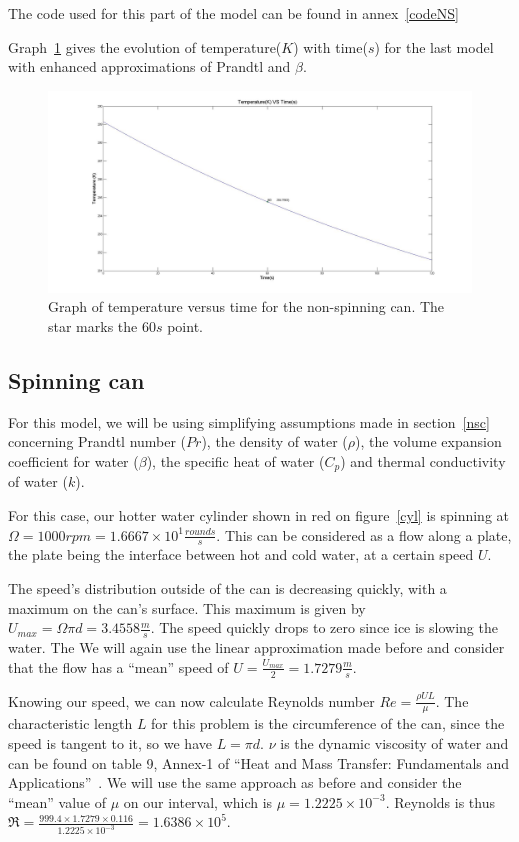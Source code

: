 \documentclass{report}
\begin{document}
	The code used for this part of the model can be found in annex~\ref{codeNS}
	
	
	Graph~\ref{NSg} gives the evolution of temperature($K$) with time($s$) for the last model with enhanced approximations of Prandtl and $\beta$.
	\begin{figure}
		\centering
		\includegraphics[width=\textwidth]{img/NSg.jpg}
		\caption{Graph of temperature versus time for the non-spinning can. The star marks the $60s$ point.}
		\label{NSg}
	\end{figure}
	
	
	
	\subsection{Spinning can}\label{sc}
	
	For this model, we will be using simplifying assumptions made in section~\ref{nsc} concerning Prandtl number ($Pr$), the density of water ($\rho$), the volume expansion coefficient  for water ($\beta$), the specific heat of water ($C_p$) and thermal conductivity of water ($k$).
	
	For this case, our hotter water cylinder shown in red on figure~\ref{cyl} is spinning at $\Omega=1000rpm=1.6667\times 10^1 \frac{rounds}{s}$. This can be considered as a flow along a plate, the plate being the interface between hot and cold water, at a certain speed $U$.
	
	The speed's distribution outside of the can is decreasing quickly, with a maximum on the can's surface. This maximum is given by $U_{max}= \Omega \pi d=3.4558\frac{m}{s}$. The speed quickly drops to zero since ice is slowing the water. The We will again use the linear approximation made before and consider that the flow has a ``mean'' speed of $U=\frac{U_{max}}{2}=1.7279\frac{m}{s}$.
	
	Knowing our speed, we can now calculate Reynolds number $Re=\frac{\rho U L}{\mu}$. The characteristic length $L$ for this problem is the circumference of the can, since the speed is tangent to it, so we have $L=\pi d$. $\nu$ is the dynamic viscosity of water and can be found on table 9, Annex-1 of ``Heat and Mass Transfer: Fundamentals and Applications''~\cite{HaMT}. We will use the same approach as before and consider the ``mean'' value of $\mu$ on our interval, which is $\mu=1.2225\times 10^{-3}$. Reynolds is thus $\Re= \frac{999.4 \times 1.7279 \times 0.116}{1.2225\times 10^{-3}}= 1.6386 \times 10^5$.
	
\end{document}
